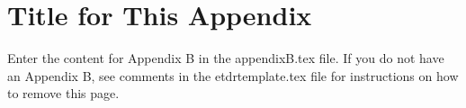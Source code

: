 
\cleardoublepage

\chapter{Title for This Appendix}
\label{Appendix:Key2}

Enter the content for Appendix B in the appendixB.tex file. If you do not have an Appendix B, see comments in the etdrtemplate.tex file for instructions on how to remove this page.
